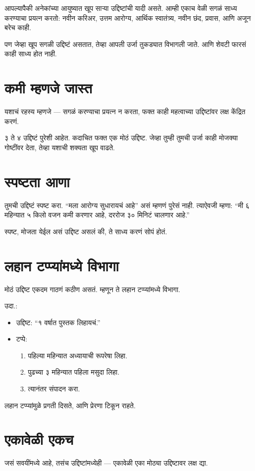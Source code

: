 आपल्यापैकी अनेकांच्या आयुष्यात खूप साऱ्या उद्दिष्टांची यादी असते.  
आम्ही एकाच वेळी सगळं साध्य करण्याचा प्रयत्न करतो:  
नवीन करिअर, उत्तम आरोग्य, आर्थिक स्वातंत्र्य,  
नवीन छंद, प्रवास, आणि अजून बरेच काही.  

पण जेव्हा खूप सगळी उद्दिष्टं असतात,  
तेव्हा आपली उर्जा तुकड्यात विभागली जाते.  
आणि शेवटी फारसं काही साध्य होत नाही.  

\section*{कमी म्हणजे जास्त}
यशाचं रहस्य म्हणजे —  
सगळं करण्याचा प्रयत्न न करता,  
फक्त काही महत्वाच्या उद्दिष्टांवर लक्ष केंद्रित करणं.  

३ ते ४ उद्दिष्टं पुरेशी आहेत.  
कदाचित फक्त एक मोठं उद्दिष्ट.  
जेव्हा तुम्ही तुमची उर्जा काही मोजक्या गोष्टींवर देता,  
तेव्हा यशाची शक्यता खूप वाढते.  

\section*{स्पष्टता आणा}
तुमची उद्दिष्टं स्पष्ट करा.  
“मला आरोग्य सुधारायचं आहे” असं म्हणणं पुरेसं नाही.  
त्याऐवजी म्हणा:  
“मी ६ महिन्यात ५ किलो वजन कमी करणार आहे,  
दररोज ३० मिनिटं चालणार आहे.”  

स्पष्ट, मोजता येईल असं उद्दिष्ट असलं की,  
ते साध्य करणं सोपं होतं.  

\section*{लहान टप्प्यांमध्ये विभागा}
मोठं उद्दिष्ट एकदम गाठणं कठीण असतं.  
म्हणून ते लहान टप्प्यांमध्ये विभागा.  

उदा.:  
\begin{itemize}
\item उद्दिष्ट: “१ वर्षात पुस्तक लिहायचं.”  
\item टप्पे:  
\begin{enumerate}
\item पहिल्या महिन्यात अध्यायाची रूपरेषा लिहा.  
\item पुढच्या ३ महिन्यात पहिला मसुदा लिहा.  
\item त्यानंतर संपादन करा.  
\end{enumerate}
\end{itemize}

लहान टप्प्यांमुळे प्रगती दिसते,  
आणि प्रेरणा टिकून राहते.  

\section*{एकावेळी एकच}
जसं सवयींमध्ये आहे,  
तसंच उद्दिष्टांमध्येही —  
एकावेळी एका मोठ्या उद्दिष्टावर लक्ष द्या.  

